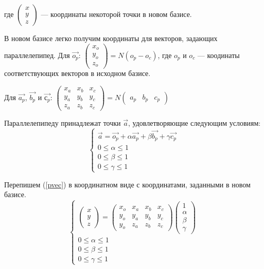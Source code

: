 \documentclass[pdftex,ptm,12pt,a4paper]{report}
\begin{document}
\begin{enumerate}
      где $\begin{pmatrix} x \\ y \\ z \end{pmatrix}$ --- координаты некоторой точки в новом базисе.

      В новом базисе легко получим координаты для векторов, задающих параллелепипед.
      Для $\vec{o_p}$: 
      $\begin{pmatrix} x_o \\ y_o \\ z_o \end{pmatrix} =  N (o_p - o_c) $, где $o_p$ и $o_c$ --- коодинаты соответствующих векторов в исходном базисе.

      Для $\vec{a_p}$, $\vec{b_p}$ и $\vec{с_p}$:
      $\begin{pmatrix} x_a & x_b & x_c \\ y_a & y_b & y_c  \\ z_a & z_b & z_c \end{pmatrix} = 
      N \begin{pmatrix} a_p & b_p  & c_p \end{pmatrix}$

      Параллелепипеду принадлежат точки $\vec{a}$, удовлетворяющие следующим условиям:
      \begin{equation}\label{pvec}
        \begin{cases}
          \vec{a} = \vec{o_p} + \alpha \vec{a_p} + \beta \vec{b_p} + \gamma \vec{c_p} \\
          0 \le  \alpha   \le  1 \\
          0 \le  \beta   \le  1 \\
          0 \le  \gamma   \le  1 
        \end{cases}
      \end{equation}

      Перепишем (\ref{pvec}) в координатном виде с координатами, заданными в новом базисе.
      \begin{equation}\label{pcoord}
        \begin{cases}
          \begin{pmatrix} x \\ y \\ z \end{pmatrix}            
          =
          \begin{pmatrix} x_o & x_a & x_b & x_c \\ y_o & y_a & y_b & y_c  \\ y_o & z_a & z_b & z_c 
          \end{pmatrix} \begin {pmatrix} 1 \\ \alpha \\ \beta \\ \gamma \end{pmatrix} \\
          0 \le  \alpha   \le  1 \\
          0 \le  \beta   \le  1 \\
          0 \le  \gamma   \le  1 
        \end{cases}
      \end{equation}


\end{enumerate}
\end{document}
